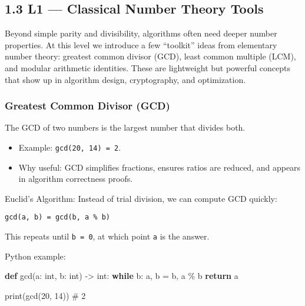 \documentclass[
  letterpaper,
  DIV=11,
  numbers=noendperiod]{scrreprt}
\newenvironment{Shaded}{\begin{snugshade}}{\end{snugshade}}
\newcommand{\BuiltInTok}[1]{\textcolor[rgb]{0.00,0.23,0.31}{#1}}
\newcommand{\CommentTok}[1]{\textcolor[rgb]{0.37,0.37,0.37}{#1}}
\newcommand{\ControlFlowTok}[1]{\textcolor[rgb]{0.00,0.23,0.31}{\textbf{#1}}}
\newcommand{\DecValTok}[1]{\textcolor[rgb]{0.68,0.00,0.00}{#1}}
\newcommand{\KeywordTok}[1]{\textcolor[rgb]{0.00,0.23,0.31}{\textbf{#1}}}
\newcommand{\NormalTok}[1]{\textcolor[rgb]{0.00,0.23,0.31}{#1}}
\newcommand{\OperatorTok}[1]{\textcolor[rgb]{0.37,0.37,0.37}{#1}}
\providecommand{\tightlist}{%
  \setlength{\itemsep}{0pt}\setlength{\parskip}{0pt}}
\begin{document}
\subsection{1.3 L1 --- Classical Number Theory
Tools}\label{l1-classical-number-theory-tools}

Beyond simple parity and divisibility, algorithms often need deeper
number properties. At this level we introduce a few ``toolkit'' ideas
from elementary number theory: greatest common divisor (GCD), least
common multiple (LCM), and modular arithmetic identities. These are
lightweight but powerful concepts that show up in algorithm design,
cryptography, and optimization.

\subsubsection{Greatest Common Divisor
(GCD)}\label{greatest-common-divisor-gcd}

The GCD of two numbers is the largest number that divides both.

\begin{itemize}
\tightlist
\item
  Example: \texttt{gcd(20,\ 14)\ =\ 2}.
\item
  Why useful: GCD simplifies fractions, ensures ratios are reduced, and
  appears in algorithm correctness proofs.
\end{itemize}

Euclid's Algorithm: Instead of trial division, we can compute GCD
quickly:

\begin{verbatim}
gcd(a, b) = gcd(b, a % b)
\end{verbatim}

This repeats until \texttt{b\ =\ 0}, at which point \texttt{a} is the
answer.

Python example:

\begin{Shaded}
\begin{Highlighting}[]
\KeywordTok{def}\NormalTok{ gcd(a: }\BuiltInTok{int}\NormalTok{, b: }\BuiltInTok{int}\NormalTok{) }\OperatorTok{{-}\textgreater{}} \BuiltInTok{int}\NormalTok{:}
    \ControlFlowTok{while}\NormalTok{ b:}
\NormalTok{        a, b }\OperatorTok{=}\NormalTok{ b, a }\OperatorTok{\%}\NormalTok{ b}
    \ControlFlowTok{return}\NormalTok{ a}

\BuiltInTok{print}\NormalTok{(gcd(}\DecValTok{20}\NormalTok{, }\DecValTok{14}\NormalTok{))  }\CommentTok{\# 2}
\end{Highlighting}
\end{Shaded}
\end{document}
